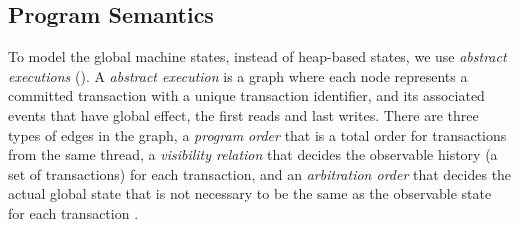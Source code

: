 \subsection{Program Semantics}

To model the global machine states, instead of heap-based states, we use \emph{abstract executions} ().
A \emph{abstract execution} is a graph where each node represents a committed transaction with a unique transaction identifier, and its associated events that have global effect, \ie the first reads and last writes.
There are three types of edges in the graph, a \emph{program order} that is a total order for transactions from the same thread, a \emph{visibility relation} that decides the observable history (a set of transactions) for each transaction, and an \emph{arbitration order} that decides the actual global state that is not necessary to be the same as the observable state for each transaction \cite{eventually-consistent-transactions,Burckhardt:2014:RDT:2535838.2535848,cerone_et_al:LIPIcs:2015:5375}.

